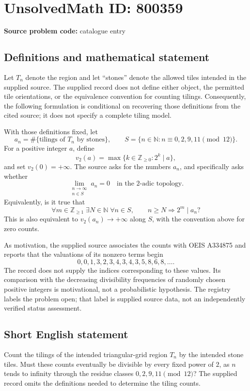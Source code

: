 \documentclass[11pt]{article}
\newcommand{\N}{\mathbb{N}}
\newcommand{\Z}{\mathbb{Z}}
\begin{document}
\section*{UnsolvedMath ID: 800359}
\textbf{Source problem code:} catalogue entry
\subsection{Definitions and mathematical statement}
Let \(T_n\) denote the region and let ``stones'' denote the allowed tiles intended in the supplied source. The supplied record does not define either object, the permitted tile orientations, or the equivalence convention for counting tilings. Consequently, the following formulation is conditional on recovering those definitions from the cited source; it does not specify a complete tiling model.

With those definitions fixed, let
\[
a_n=\#\{\text{tilings of }T_n\text{ by stones}\},
\qquad
S=\{n\in\N:n\equiv 0,2,9,11\pmod{12}\}.
\]
For a positive integer \(a\), define
\[
v_2(a)=\max\{k\in\Z_{\geq 0}:2^k\mid a\},
\]
and set \(v_2(0)=+\infty\). The source asks for the numbers \(a_n\), and specifically asks whether
\[
\lim_{\substack{n\to\infty\\n\in S}}a_n=0
\quad\text{in the }2\text{-adic topology}.
\]
Equivalently, is it true that
\[
\forall m\in\Z_{\geq 1}\;\exists N\in\N\;\forall n\in S,
\qquad n\geq N\Longrightarrow 2^m\mid a_n?
\]
This is also equivalent to \(v_2(a_n)\to+\infty\) along \(S\), with the convention above for zero counts.

As motivation, the supplied source associates the counts with OEIS A334875 and reports that the valuations of its nonzero terms begin
\[
0,0,1,3,2,3,4,3,4,3,5,8,6,8,\ldots.
\]
The record does not supply the indices corresponding to these values. Its comparison with the decreasing divisibility frequencies of randomly chosen positive integers is motivational, not a probabilistic hypothesis. The registry labels the problem open; that label is supplied source data, not an independently verified status assessment.
\subsection{Short English statement}
Count the tilings of the intended triangular-grid region \(T_n\) by the intended stone tiles. Must these counts eventually be divisible by every fixed power of \(2\), as \(n\) tends to infinity through the residue classes \(0,2,9,11\pmod{12}\)? The supplied record omits the definitions needed to determine the tiling counts.
\end{document}
